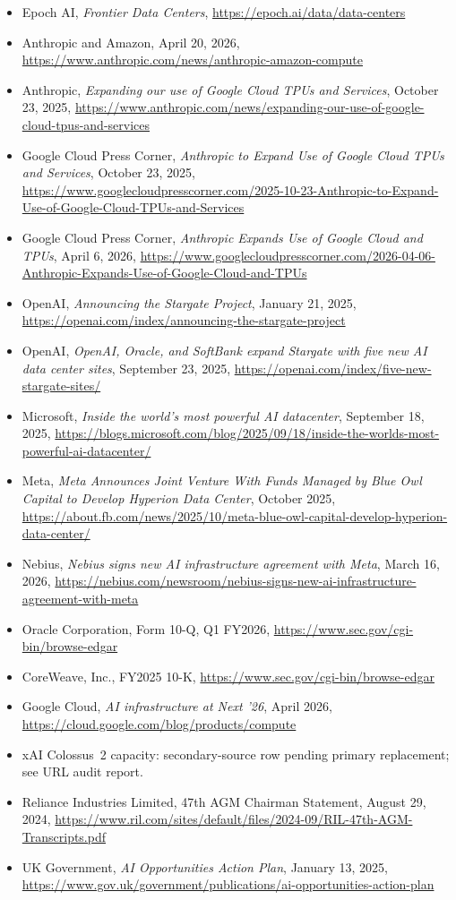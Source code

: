 \documentclass[11pt,a4paper]{article}
\begin{document}
{\sloppy
\begin{itemize}[leftmargin=1.2em,itemsep=0.12em,topsep=0.3em]
\item Epoch AI, \emph{Frontier Data Centers}, \url{https://epoch.ai/data/data-centers}
\item Anthropic and Amazon, April 20, 2026, \url{https://www.anthropic.com/news/anthropic-amazon-compute}
\item Anthropic, \emph{Expanding our use of Google Cloud TPUs and Services}, October 23, 2025, \url{https://www.anthropic.com/news/expanding-our-use-of-google-cloud-tpus-and-services}
\item Google Cloud Press Corner, \emph{Anthropic to Expand Use of Google Cloud TPUs and Services}, October 23, 2025, \url{https://www.googlecloudpresscorner.com/2025-10-23-Anthropic-to-Expand-Use-of-Google-Cloud-TPUs-and-Services}
\item Google Cloud Press Corner, \emph{Anthropic Expands Use of Google Cloud and TPUs}, April 6, 2026, \url{https://www.googlecloudpresscorner.com/2026-04-06-Anthropic-Expands-Use-of-Google-Cloud-and-TPUs}
\item OpenAI, \emph{Announcing the Stargate Project}, January 21, 2025, \url{https://openai.com/index/announcing-the-stargate-project}
\item OpenAI, \emph{OpenAI, Oracle, and SoftBank expand Stargate with five new AI data center sites}, September 23, 2025, \url{https://openai.com/index/five-new-stargate-sites/}
\item Microsoft, \emph{Inside the world's most powerful AI datacenter}, September 18, 2025, \url{https://blogs.microsoft.com/blog/2025/09/18/inside-the-worlds-most-powerful-ai-datacenter/}
\item Meta, \emph{Meta Announces Joint Venture With Funds Managed by Blue Owl Capital to Develop Hyperion Data Center}, October 2025, \url{https://about.fb.com/news/2025/10/meta-blue-owl-capital-develop-hyperion-data-center/}
\item Nebius, \emph{Nebius signs new AI infrastructure agreement with Meta}, March 16, 2026, \url{https://nebius.com/newsroom/nebius-signs-new-ai-infrastructure-agreement-with-meta}
\item Oracle Corporation, Form 10-Q, Q1 FY2026, \url{https://www.sec.gov/cgi-bin/browse-edgar}
\item CoreWeave, Inc., FY2025 10-K, \url{https://www.sec.gov/cgi-bin/browse-edgar}
\item Google Cloud, \emph{AI infrastructure at Next '26}, April 2026, \url{https://cloud.google.com/blog/products/compute}
\item xAI Colossus~2 capacity: secondary-source row pending primary replacement; see URL audit report.
\item Reliance Industries Limited, 47th AGM Chairman Statement, August 29, 2024, \url{https://www.ril.com/sites/default/files/2024-09/RIL-47th-AGM-Transcripts.pdf}
\item UK Government, \emph{AI Opportunities Action Plan}, January 13, 2025, \url{https://www.gov.uk/government/publications/ai-opportunities-action-plan}
\end{itemize}
}
\end{document}
